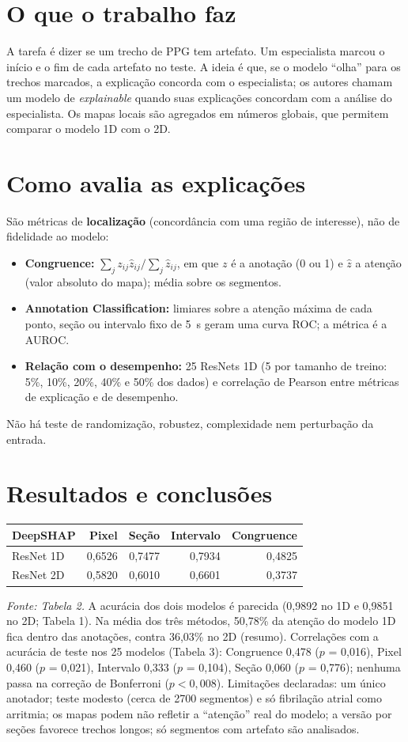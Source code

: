 \documentclass[11pt,a4paper]{article}
\begin{document}
\section{O que o trabalho faz}
A tarefa é dizer se um trecho de PPG tem artefato. Um especialista marcou o início e o fim de cada artefato no teste. A ideia é que, se o modelo “olha” para os trechos marcados, a explicação concorda com o especialista; os autores chamam um modelo de \textit{explainable} quando suas explicações concordam com a análise do especialista. Os mapas locais são agregados em números globais, que permitem comparar o modelo 1D com o 2D.

\section{Como avalia as explicações}
São métricas de \textbf{localização} (concordância com uma região de interesse), não de fidelidade ao modelo:
\begin{itemize}
\item \textbf{Congruence:} $\sum_j z_{ij}\hat z_{ij} / \sum_j \hat z_{ij}$, em que $z$ é a anotação (0 ou 1) e $\hat z$ a atenção (valor absoluto do mapa); média sobre os segmentos.
\item \textbf{Annotation Classification:} limiares sobre a atenção máxima de cada ponto, seção ou intervalo fixo de 5~s geram uma curva ROC; a métrica é a AUROC.
\item \textbf{Relação com o desempenho:} 25 ResNets 1D (5 por tamanho de treino: 5\%, 10\%, 20\%, 40\% e 50\% dos dados) e correlação de Pearson entre métricas de explicação e de desempenho.
\end{itemize}
Não há teste de randomização, robustez, complexidade nem perturbação da entrada.

\section{Resultados e conclusões}
\begin{center}\small
\begin{tabular}{lrrrr}
\toprule
\textbf{DeepSHAP} & \textbf{Pixel} & \textbf{Seção} & \textbf{Intervalo} & \textbf{Congruence} \\
\midrule
ResNet 1D & 0,6526 & 0,7477 & 0,7934 & 0,4825 \\
ResNet 2D & 0,5820 & 0,6010 & 0,6601 & 0,3737 \\
\bottomrule
\end{tabular}
\end{center}
\textit{Fonte: Tabela 2.} A acurácia dos dois modelos é parecida (0,9892 no 1D e 0,9851 no 2D; Tabela 1). Na média dos três métodos, 50,78\% da atenção do modelo 1D fica dentro das anotações, contra 36,03\% no 2D (resumo). Correlações com a acurácia de teste nos 25 modelos (Tabela 3): Congruence 0,478 ($p$ = 0,016), Pixel 0,460 ($p$ = 0,021), Intervalo 0,333 ($p$ = 0,104), Seção 0,060 ($p$ = 0,776); nenhuma passa na correção de Bonferroni ($p < 0{,}008$). Limitações declaradas: um único anotador; teste modesto (cerca de 2700 segmentos) e só fibrilação atrial como arritmia; os mapas podem não refletir a “atenção” real do modelo; a versão por seções favorece trechos longos; só segmentos com artefato são analisados.
\end{document}
